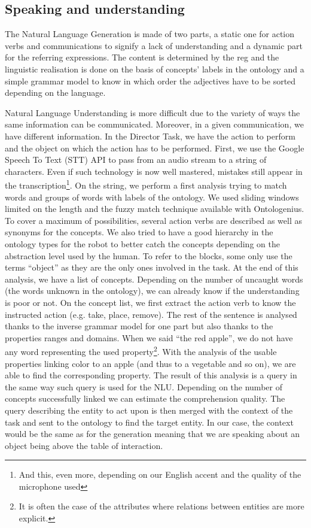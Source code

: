 \subsection{Speaking and understanding}

The Natural Language Generation is made of two parts, a static one for action verbs and communications to signify a lack of understanding and a dynamic part for the referring expressions. The content is determined by the \acrshort{reg} and the linguistic realisation is done on the basis of concepts' labels in the ontology and a simple grammar model to know in which order the adjectives have to be sorted depending on the language.

Natural Language Understanding is more difficult due to the variety of ways the same information can be communicated. Moreover, in a given communication, we have different information. In the Director Task, we have the action to perform and the object on which the action has to be performed. First, we use the Google Speech To Text (STT) API to pass from an audio stream to a string of characters. Even if such technology is now well mastered, mistakes still appear in the transcription\footnote{And this, even more, depending on our English accent and the quality of the microphone used}. On the string, we perform a first analysis trying to match words and groups of words with labels of the ontology. We used sliding windows limited on the length and the fuzzy match technique available with Ontologenius. To cover a maximum of possibilities, several action verbs are described as well as synonyms for the concepts. We also tried to have a good hierarchy in the ontology types for the robot to better catch the concepts depending on the abstraction level used by the human. To refer to the blocks, some only use the terms ``object'' as they are the only ones involved in the task. At the end of this analysis, we have a list of concepts. Depending on the number of uncaught words (the words unknown in the ontology), we can already know if the understanding is poor or not. On the concept list, we first extract the action verb to know the instructed action (e.g. take, place, remove). The rest of the sentence is analysed thanks to the inverse grammar model for one part but also thanks to the properties ranges and domains. When we said ``the red apple'', we do not have any word representing the used property\footnote{It is often the case of the attributes where relations between entities are more explicit.}. With the analysis of the usable properties linking color to an apple (and thus to a vegetable and so on), we are able to find the corresponding property. The result of this analysis is a \sparql{} query in the same way such query is used for the NLU. Depending on the number of concepts successfully linked we can estimate the comprehension quality. The \sparql{} query describing the entity to act upon is then merged with the context of the task and sent to the ontology to find the target entity. In our case, the context would be the same as for the generation meaning that we are speaking about an object being above the table of interaction.

